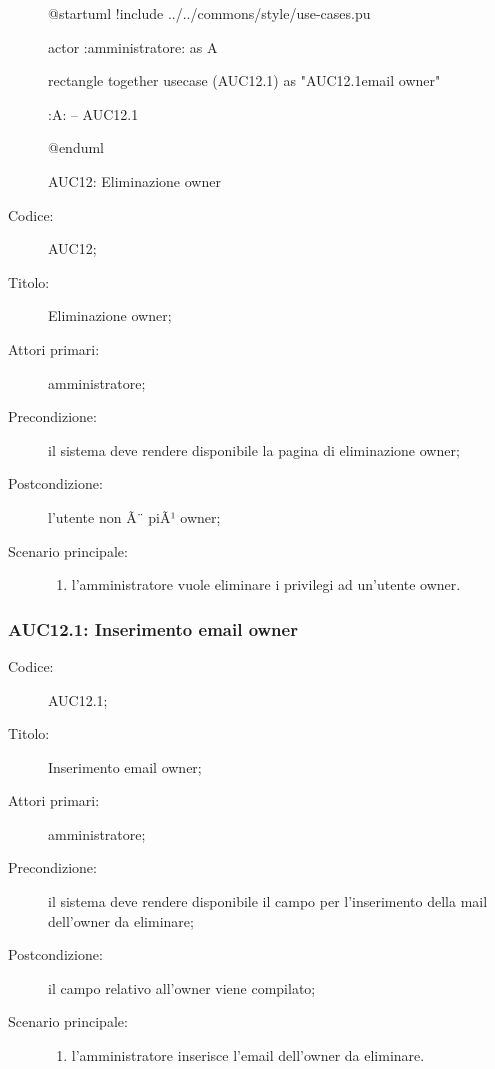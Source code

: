 \documentclass[../../../analisi-dei-requisiti.tex]{subfiles}
\begin{document}
\begin{figure}[H]
  \centering
  \begin{plantuml}
  @startuml
  !include ../../commons/style/use-cases.pu

  actor :amministratore: as A

  rectangle {
    together {
      usecase (AUC12.1) as "AUC12.1\nInserimento email owner"
    }
  }

  :A: -- AUC12.1

  @enduml
  \end{plantuml}
  \caption{AUC12: Eliminazione owner}%
  \label{fig:auc12}
\end{figure}

\begin{description}
  \item[Codice:] AUC12;
  \item[Titolo:] Eliminazione owner;
  \item[Attori primari:] amministratore;
  \item[Precondizione:] il sistema deve rendere disponibile la pagina di eliminazione owner;
  \item[Postcondizione:] l'utente non Ã¨ piÃ¹ owner;
  \item[Scenario principale:]
  \begin{enumerate}
    \item l'amministratore vuole eliminare i privilegi ad un'utente owner.
  \end{enumerate}
\end{description}

\subsubsection{AUC12.1: Inserimento email owner}%
\label{subs:AUC12.1}
\begin{description}
  \item[Codice:] AUC12.1;
  \item[Titolo:] Inserimento email owner;
  \item[Attori primari:] amministratore;
  \item[Precondizione:] il sistema deve rendere disponibile il campo per l'inserimento della mail dell'owner da eliminare;
  \item[Postcondizione:] il campo relativo all'owner viene compilato;
  \item[Scenario principale:]
  \begin{enumerate}
    \item l'amministratore inserisce l'email dell'owner da eliminare.
  \end{enumerate}
\end{description}
\end{document}
